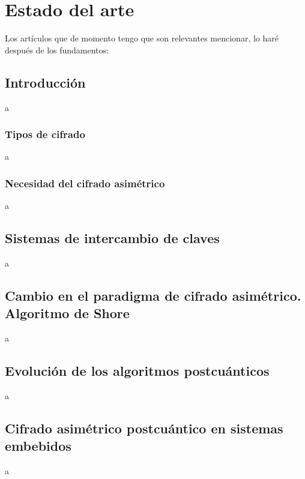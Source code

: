 \chapter{Estado del arte}
Los artículos que de momento tengo que son relevantes mencionar, lo haré después de los fundamentos:
\cite{NIST_IR_8413_2022} \cite{NIST_IR_8545_2025} \cite{011318_1_5.0179566} \cite{s11042-024-20535-x} \cite{A_COMPARATIVE_REVIEW_OF_DATA_ENCRYPTION_METHODS_IN_THE_USA_AND_EUROPE} \cite{An_Overview_and_Analysis_of_Hybrid_Encryption_The_Combination_of_Symmetric_Encryption_and_Asymmetric_Encryption} \cite{Comparative_Analysis_of_Energy_Costs_of_Asymmetric_vs_Symmetric_Encryption-Based_Security_Applications} \cite{First-Order-Masked-Kyber-on-ARM Cortex-M4} \cite{2022-414} \cite{An_overview_of_Quantum_Cryptography_and} \cite{2502.12252v1} \cite{Quantum_Resistance_Saber-Based_Group_Key_Exchange_Protocol_for_IoT} \cite{NISTFIPS203}
\section{Introducción}
a
\subsection{Tipos de cifrado}
a
\subsection{Necesidad del cifrado asimétrico}
a
\section{Sistemas de intercambio de claves}
a
\section{Cambio en el paradigma de cifrado asimétrico. Algoritmo de Shore}
a
\section{Evolución de los algoritmos postcuánticos}
a
\section{Cifrado asimétrico postcuántico en sistemas embebidos}
a